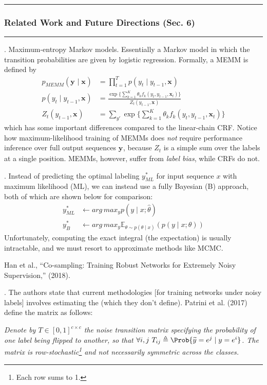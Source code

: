 \documentclass[11pt]{article}
\renewcommand\vec[2][]{\bm{#2}_{#1}}
\newcommand\myspace[1][]{\vspace{#1\bigskipamount}}
\newcommand\p{\Needspace{10\baselineskip} \noindent}
\newcommand\subsub[1]{\Needspace{15\baselineskip}\hrule\subsubsection{#1}\hrule}
\begin{document}
\myspace{}
\subsub{Related Work and Future Directions (Sec. 6)}
\myspace

\p {}. Maximum-entropy Markov models. Essentially a Markov model in which the transition probabilities are given by logistic regression. Formally, a MEMM is defined by
\begin{align}
	p_{MEMM}(\vec y \mid \vec x) &= \prod_{t = 1}^{T} p(y_t \mid y_{t -1}, \vec x) \\
	p(y_t \mid y_{t-1}, \vec x) &= \frac{ \exp\bigg\{  \sum_{k=1}^{K} \theta_k f_k(y_t, y_{t-1}, \vec[t]{x}) \bigg\} }{ Z_t(y_{t-1}, \vec x) } \\
	Z_t(y_{t-1}, \vec x) &= \sum_{y'} \exp\bigg\{  \sum_{k=1}^{K} \theta_k f_k(y_t, y_{t-1}, \vec[t]{x}) \bigg\}
\end{align}
which has some important differences compared to the linear-chain CRF. Notice how maximum-likelihood training of MEMMs does \textit{not} require performance inference over full output sequences $\vec y$, because $Z_t$ is a simple sum over the labels at a single position. MEMMs, however, suffer from \textit{label bias}, while CRFs do not.

\myspace
\p {}. Instead of predicting the optimal labeling $y_{ML}^*$ for input sequence $x$ with maximum likelihood (ML), we can instead use a fully Bayesian (B) approach, both of which are shown below for comparison:
\begin{align}
	y_{ML}^* &\leftarrow arg\,max_y p(y \mid x; \hat{\theta}) \\
	y_{B}^* &\leftarrow arg\,max_y \mathbb{E}_{\theta \sim p(\theta \mid x)}(p(y \mid x; \theta))
\end{align}
Unfortunately, computing the exact integral (the expectation) is usually intractable, and we must resort to approximate methods like MCMC.  






\vspace{-1em}
{\footnotesize Han et al., ``Co-sampling: Training Robust Networks for Extremely Noisy Supervision,'' (2018).}

\p {}. The authors state that current methodologies [for training networks under noisy labels] involves estimating the  (which they don't define). Patrini et al. (2017) define the matrix as follows:
\begin{center}
	\begin{small}
		{\itshape 
			Denote by $T \in [0, 1]^{c \times c}$ the noise transition matrix specifying the probability of one label being flipped to another, so that $\forall i, j ~ T_{ij} \triangleq \Prob{\widetilde y = e^j \mid y = e^i}$. The matrix is row-stochastic\footnote{Each row sums to 1.} and not necessarily symmetric across the classes.
		}
	\end{small}
\end{center}
\end{document}
